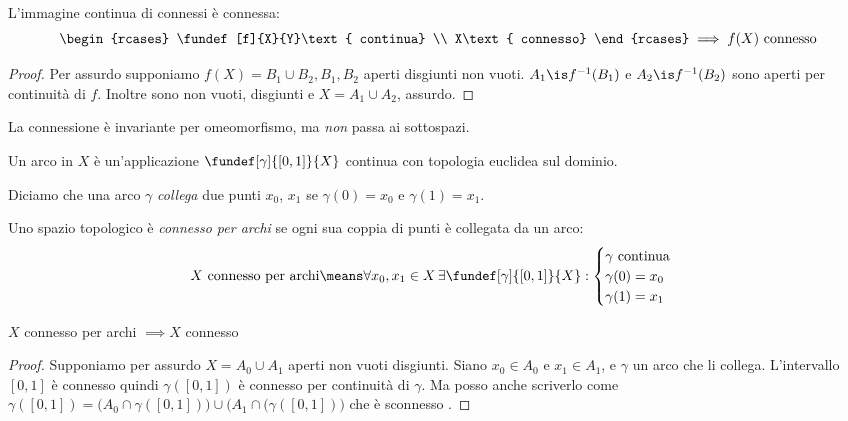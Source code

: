 
\begin{teo}
 L'immagine continua di connessi è connessa:
 \[\begin{rcases}
  \fundef[f]{X}{Y}\text{ continua} \\
  X\text{ connesso}
 \end{rcases}\implies
 f(X)\text{ connesso}\] 
\end{teo}

\begin{proof}
 Per assurdo supponiamo $f(X) = B_1 \cup B_2, B_1,B_2$ aperti disgiunti non vuoti.
 $A_1\is f^{-1}(B_1)$ e $A_2\is f^{-1}(B_2)$ sono aperti per continuità di $f$.
 Inoltre sono non vuoti, disgiunti e $X=A_1\cup A_2$, assurdo.
\end{proof}

\begin{oss}
 La connessione è invariante per omeomorfismo, ma \emph{non} passa ai sottospazi. 
\end{oss}

\begin{defn}[Arco]
 Un arco in $X$ è un'applicazione $\fundef[\gamma]{[0,1]}{X}$ continua con topologia euclidea sul dominio.
\end{defn}

Diciamo che una arco $\gamma$ \emph{collega} due punti $x_0$, $x_1$ se $\gamma(0)=x_0$ e $\gamma(1)=x_1$.

\begin{defn}
 Uno spazio topologico è \emph{connesso per archi} se ogni sua coppia di punti è collegata da un arco:
 \[\text{$X$ connesso per archi}\means
 \forall x_0, x_1 \in X \,\exists \fundef[\gamma]{[0,1]}{X}:\begin{cases}
  \text{$\gamma$ continua} \\
  \gamma(0)=x_0 \\
  \gamma(1)=x_1
 \end{cases}\]
\end{defn}

\begin{prop}
 $X$ connesso per archi $\implies X$ connesso
\end{prop}

\begin{proof}
 Supponiamo per assurdo $X=A_0\cup A_1$ aperti non vuoti disgiunti.
 Siano $x_0\in A_0$ e $x_1\in A_1$,
 e $\gamma$ un arco che li collega.
 L'intervallo $[0,1]$ è connesso quindi $\gamma([0,1])$ è connesso per continuità di $\gamma$.
 Ma posso anche scriverlo come
 $\gamma([0,1])=\big(A_0\cap \gamma([0,1])\big) \cup \big(A_1\cap(\gamma([0,1])\big)$
 che è sconnesso \absurd.
\end{proof}

